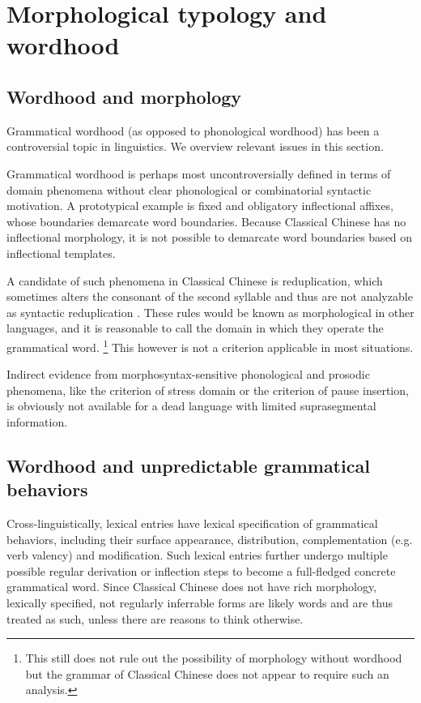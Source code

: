 \documentclass[UTF8, a4paper, oneside, scheme=plain, 12pt]{ctexrep}
\newcommand*{\citepages}[1]{pp.~{#1}}
\begin{document}
\section{Morphological typology and wordhood}\label{sec:grammatical.morphology}

\subsection{Wordhood and morphology}\label{sec:grammatical.morphology.template}

Grammatical wordhood (as opposed to phonological wordhood) has been a controversial topic in linguistics.
We overview relevant issues in this section.

Grammatical wordhood is perhaps most uncontroversially defined in terms of domain phenomena without clear phonological or combinatorial syntactic motivation.
A prototypical example is fixed and obligatory inflectional affixes, whose boundaries demarcate word boundaries. 
Because Classical Chinese has no inflectional morphology,
it is not possible to demarcate word boundaries based on inflectional templates.

A candidate of such phenomena in Classical Chinese is reduplication,
which sometimes alters the consonant of the second syllable 
and thus are not analyzable as syntactic reduplication \citep{travis2001syntax}.
These rules would be known as morphological in other languages,
and it is reasonable to call the domain in which they operate the grammatical word.%
\footnote{
    This still does not rule out the possibility of morphology without wordhood
    but the grammar of Classical Chinese does not appear to require such an analysis.
}
This however is not a criterion applicable in most situations.

Indirect evidence from morphosyntax-sensitive phonological and prosodic phenomena, 
like the criterion of stress domain \citep[\citepages{41-42}]{zhudexigrammar} or the criterion of pause insertion,
is obviously not available for a dead language with limited suprasegmental information.

\subsection{Wordhood and unpredictable grammatical behaviors}\label{sec:grammatical.morphology.lexicalization}

Cross-linguistically, lexical entries have lexical specification of grammatical behaviors,
including their surface appearance, distribution, complementation (e.g. verb valency) and modification.
Such lexical entries further undergo multiple possible regular derivation or inflection steps to become a full-fledged concrete grammatical word.
Since Classical Chinese does not have rich morphology,
lexically specified, not regularly inferrable forms are likely words and are thus treated as such, unless there are reasons to think otherwise.
\end{document}

